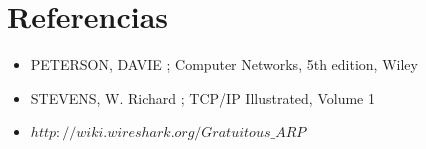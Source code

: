 \documentclass[10pt, a4paper]{article}
\begin{document}
\section{Referencias}
\begin{itemize}
\item PETERSON, DAVIE ; Computer Networks, 5th edition, Wiley
\item STEVENS, W. Richard ; TCP/IP Illustrated, Volume 1
\item $http://wiki.wireshark.org/Gratuitous\_ARP$
\end{itemize}
\end{document}
